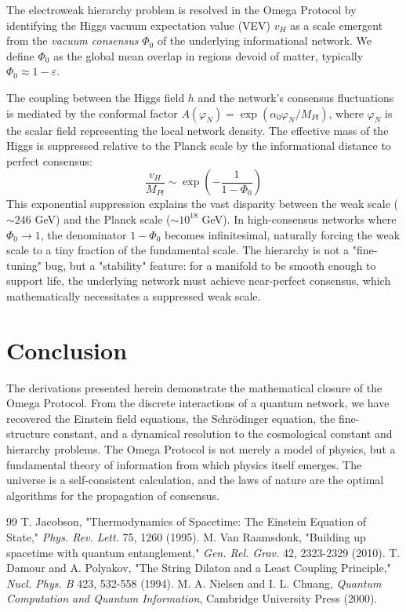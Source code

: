 \documentclass[11pt,template]{article}
\begin{document}
The electroweak hierarchy problem is resolved in the Omega Protocol by identifying the Higgs vacuum expectation value (VEV) $v_H$ as a scale emergent from the \textit{vacuum consensus} $\Phi_0$ of the underlying informational network. We define $\Phi_0$ as the global mean overlap in regions devoid of matter, typically $\Phi_0 \approx 1 - \varepsilon$.

The coupling between the Higgs field $h$ and the network's consensus fluctuations is mediated by the conformal factor $A(\varphi_N) = \exp(\alpha_0 \varphi_N / M_{Pl})$, where $\varphi_N$ is the scalar field representing the local network density. The effective mass of the Higgs is suppressed relative to the Planck scale by the informational distance to perfect consensus:
\begin{equation}
    \frac{v_H}{M_{Pl}} \sim \exp\left( -\frac{1}{1-\Phi_0} \right)
\end{equation}
This exponential suppression explains the vast disparity between the weak scale ($\sim 246$ GeV) and the Planck scale ($\sim 10^{18}$ GeV). In high-consensus networks where $\Phi_0 \to 1$, the denominator $1-\Phi_0$ becomes infinitesimal, naturally forcing the weak scale to a tiny fraction of the fundamental scale. The hierarchy is not a "fine-tuning" bug, but a "stability" feature: for a manifold to be smooth enough to support life, the underlying network must achieve near-perfect consensus, which mathematically necessitates a suppressed weak scale.

\section{Conclusion}

The derivations presented herein demonstrate the mathematical closure of the Omega Protocol. From the discrete interactions of a quantum network, we have recovered the Einstein field equations, the Schrödinger equation, the fine-structure constant, and a dynamical resolution to the cosmological constant and hierarchy problems. The Omega Protocol is not merely a model of physics, but a fundamental theory of information from which physics itself emerges. The universe is a self-consistent calculation, and the laws of nature are the optimal algorithms for the propagation of consensus.

\begin{thebibliography}{99}
 T. Jacobson, "Thermodynamics of Spacetime: The Einstein Equation of State," \textit{Phys. Rev. Lett.} 75, 1260 (1995).
 M. Van Raamsdonk, "Building up spacetime with quantum entanglement," \textit{Gen. Rel. Grav.} 42, 2323-2329 (2010).
 T. Damour and A. Polyakov, "The String Dilaton and a Least Coupling Principle," \textit{Nucl. Phys. B} 423, 532-558 (1994).
 M. A. Nielsen and I. L. Chuang, \textit{Quantum Computation and Quantum Information}, Cambridge University Press (2000).
\end{thebibliography}
\end{document}
